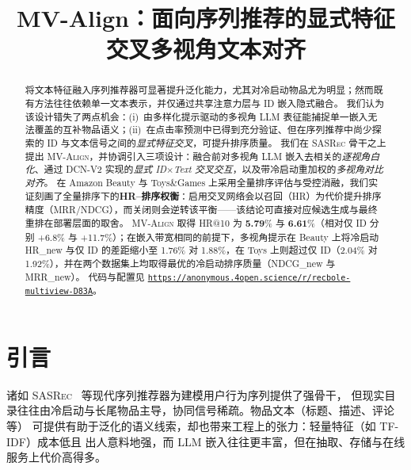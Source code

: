 \documentclass[sigconf,natbib=true,anonymous]{acmart}
\newcommand{\model}{\textsc{MV-Align}\xspace}
\newcommand{\base}{\textsc{SASRec}\xspace}
\newcommand{\tfidf}{\textsc{TF-IDF}\xspace}
\newcommand{\llm}{\textsc{LLM}\xspace}
\begin{document}
\title{MV-Align：面向序列推荐的显式特征交叉多视角文本对齐}


\begin{abstract}
将文本特征融入序列推荐器可显著提升泛化能力，尤其对冷启动物品尤为明显；然而既有方法往往依赖单一文本表示，并仅通过共享注意力层与 ID 嵌入隐式融合。
我们认为该设计错失了两点机会：(i)~由多样化提示驱动的多视角 \llm 表征能捕捉单一嵌入无法覆盖的互补物品语义；(ii)~在点击率预测中已得到充分验证、但在序列推荐中尚少探索的 ID 与文本信号之间的\emph{显式特征交叉}，可提升排序质量。
%
我们在 \base 骨干之上提出 \model，并协调引入三项设计：融合前对多视角 \llm 嵌入去相关的\emph{逐视角白化}、通过 DCN-V2 实现的\emph{显式 ID$\times$Text 交叉交互}，以及带冷启动重加权的\emph{多视角对比对齐}。
在 Amazon Beauty 与 Toys\&Games 上采用全量排序评估与受控消融，我们实证刻画了全量排序下的\textbf{HR--排序权衡}：启用交叉网络会以召回（HR）为代价提升排序精度（MRR/NDCG），而关闭则会逆转该平衡——该结论可直接对应候选生成与最终重排在部署层面的取舍。
%
\model 取得 HR@10 为 \textbf{5.79}\% 与 \textbf{6.61}\%（相对仅 ID 分别 +6.8\% 与 +11.7\%）；在嵌入带宽相同的前提下，多视角提示在 Beauty 上将冷启动 HR\_new 与仅 ID 的差距缩小至 1.76\% 对 1.88\%，在 Toys 上则超过仅 ID（2.04\% 对 1.92\%），并在两个数据集上均取得最优的冷启动排序质量（NDCG\_new 与 MRR\_new）。
代码与配置见 \texttt{\url{https://anonymous.4open.science/r/recbole-multiview-D83A}}。
\end{abstract}


\maketitle

\section{引言}

诸如 \base~\cite{kang2018sasrec} 等现代序列推荐器为建模用户行为序列提供了强骨干，
但现实目录往往由冷启动与长尾物品主导，协同信号稀疏。物品文本（标题、描述、评论等）
可提供有助于泛化的语义线索，却也带来工程上的张力：轻量特征（如 \tfidf）成本低且
 出人意料地强，而 \llm 嵌入往往更丰富，但在抽取、存储与在线服务上代价高得多。
\end{document}
